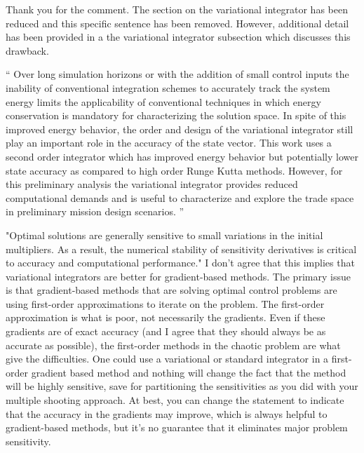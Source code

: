 \documentclass[11pt]{article}
\newenvironment{correction}{\begin{list}{}{\setlength{\leftmargin}{1cm}\setlength{\rightmargin}{1cm}}\vspace{\parsep}\item[]``}{''\end{list}}
\begin{document}
\begin{enumerate}
Thank you for the comment.
The section on the variational integrator has been reduced and this specific sentence has been removed. 
However, additional detail has been provided in a the variational integrator subsection which discusses this drawback.

\begin{correction}
Over long simulation horizons or with the addition of small control inputs the inability of conventional integration schemes to accurately track the system energy limits the applicability of conventional techniques in which energy conservation is mandatory for characterizing the solution space.
In spite of this improved energy behavior, the order and design of the variational integrator still play an important role in the accuracy of the state vector.
This work uses a second order integrator which has improved energy behavior but potentially lower state accuracy as compared to high order Runge Kutta methods. 
However, for this preliminary analysis the variational integrator provides reduced computational demands and is useful to characterize and explore the trade space in preliminary mission design scenarios.
\end{correction}
\item 
    \begin{itshape}
"Optimal solutions are generally sensitive to small variations in the initial multipliers. As a result, the numerical stability of sensitivity derivatives is critical to accuracy and computational performance."  I don't agree that this implies that variational integrators are better for gradient-based methods.  The primary issue is that gradient-based methods that are solving optimal control problems are using first-order approximations to iterate on the problem.  The first-order approximation is what is poor, not necessarily the gradients.  Even if these gradients are of exact accuracy (and I agree that they should always be as accurate as possible), the first-order methods in the chaotic problem are what give the difficulties.  One could use a variational or standard integrator in a first-order gradient based method and nothing will change the fact that the method will be highly sensitive, save for partitioning the sensitivities as you did with your multiple shooting approach.  At best, you can change the statement to indicate that the accuracy in the gradients may improve, which is always helpful to gradient-based methods, but it's no guarantee that it eliminates major problem sensitivity.
\end{itshape}


\end{enumerate}
\end{document}
